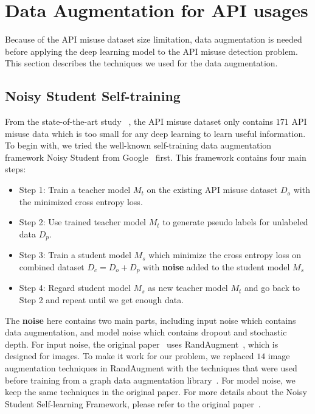 \section{Data Augmentation for API usages}
\label{sec:data-aug}

Because of the API misuse dataset size limitation, data augmentation is needed before applying the deep learning model to the API misuse detection problem. This section describes the techniques we used for the data augmentation.

\subsection{Noisy Student Self-training}

From the state-of-the-art study ~\cite{msr19}, the API misuse dataset only contains $171$ API misuse data which is too small for any deep learning to learn useful information. To begin with, we tried the well-known self-training data augmentation framework Noisy Student from Google~\cite {xie2020self} first. This framework contains four main steps:

\begin{itemize}
	\item Step 1: Train a teacher model $M_t$ on the existing API misuse dataset $D_o$ with the minimized cross entropy loss.
	\item Step 2: Use trained teacher model $M_t$ to generate pseudo labels for unlabeled data $D_p$.
	\item Step 3: Train a student model $M_s$ which minimize the cross entropy loss on combined dataset $D_c = D_o + D_p$ with {\bf{noise}} added to the student model $M_s$
	\item Step 4: Regard student model $M_s$ as new teacher model $M_t$ and go back to Step 2 and repeat until we get enough data. 
\end{itemize}

The {\bf{noise}} here contains two main parts, including input noise which contains data augmentation, and model noise which contains dropout and stochastic depth. For input noise, the original paper~\cite{xie2020self} uses RandAugment~\cite{cubuk2020randaugment}, which is designed for images. To make it work for our problem, we replaced $14$ image augmentation techniques in RandAugment with the techniques that were used before training from a graph data augmentation library~\cite{grafog}. For model noise, we keep the same techniques in the original paper. For more details about the Noisy Student Self-learning Framework, please refer to the original paper~\cite{xie2020self}.


